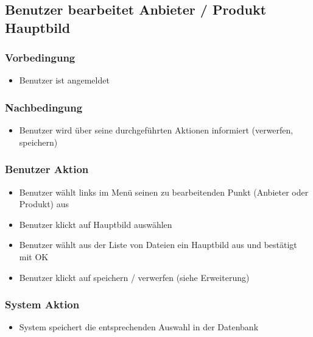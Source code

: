\documentclass[a4paper,12pt]{article}
\begin{document}
\subsection{Benutzer bearbeitet Anbieter / Produkt Hauptbild}

\subsubsection{Vorbedingung}\label{vorbedingung-4}

\begin{itemize}

\item
  Benutzer ist angemeldet
\end{itemize}

\subsubsection{Nachbedingung}\label{nachbedingung-4}

\begin{itemize}

\item
  Benutzer wird über seine durchgeführten Aktionen informiert
  (verwerfen, speichern)
\end{itemize}

\subsubsection{Benutzer Aktion}\label{benutzer-aktion-4}

\begin{itemize}

\item
  Benutzer wählt links im Menü seinen zu bearbeitenden Punkt (Anbieter
  oder Produkt) aus
\item
  Benutzer klickt auf Hauptbild auswählen
\item
  Benutzer wählt aus der Liste von Dateien ein Hauptbild aus und
  bestätigt mit OK
\item
  Benutzer klickt auf speichern / verwerfen (siehe Erweiterung)
\end{itemize}

\subsubsection{System Aktion}\label{system-aktion-4}

\begin{itemize}

\item
  System speichert die entsprechenden Auswahl in der Datenbank
\end{itemize}
\end{document}
